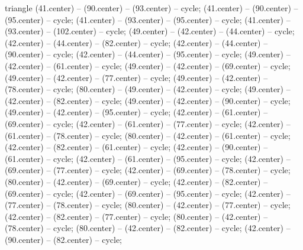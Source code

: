 {\begin{pgfonlayer}{triangle}
 (41.center) -- (90.center) -- (93.center) -- cycle; 
 (41.center) -- (90.center) -- (95.center) -- cycle; 
 (41.center) -- (93.center) -- (95.center) -- cycle; 
 (41.center) -- (93.center) -- (102.center) -- cycle; 
 (49.center) -- (42.center) -- (44.center) -- cycle; 
 (42.center) -- (44.center) -- (82.center) -- cycle; 
 (42.center) -- (44.center) -- (90.center) -- cycle; 
 (42.center) -- (44.center) -- (95.center) -- cycle; 
 (49.center) -- (42.center) -- (61.center) -- cycle; 
 (49.center) -- (42.center) -- (69.center) -- cycle; 
 (49.center) -- (42.center) -- (77.center) -- cycle; 
 (49.center) -- (42.center) -- (78.center) -- cycle; 
 (80.center) -- (49.center) -- (42.center) -- cycle; 
 (49.center) -- (42.center) -- (82.center) -- cycle; 
 (49.center) -- (42.center) -- (90.center) -- cycle; 
 (49.center) -- (42.center) -- (95.center) -- cycle; 
 (42.center) -- (61.center) -- (69.center) -- cycle; 
 (42.center) -- (61.center) -- (77.center) -- cycle; 
 (42.center) -- (61.center) -- (78.center) -- cycle; 
 (80.center) -- (42.center) -- (61.center) -- cycle; 
 (42.center) -- (82.center) -- (61.center) -- cycle; 
 (42.center) -- (90.center) -- (61.center) -- cycle; 
 (42.center) -- (61.center) -- (95.center) -- cycle; 
 (42.center) -- (69.center) -- (77.center) -- cycle; 
 (42.center) -- (69.center) -- (78.center) -- cycle; 
 (80.center) -- (42.center) -- (69.center) -- cycle; 
 (42.center) -- (82.center) -- (69.center) -- cycle; 
 (42.center) -- (69.center) -- (95.center) -- cycle; 
 (42.center) -- (77.center) -- (78.center) -- cycle; 
 (80.center) -- (42.center) -- (77.center) -- cycle; 
 (42.center) -- (82.center) -- (77.center) -- cycle; 
 (80.center) -- (42.center) -- (78.center) -- cycle; 
 (80.center) -- (42.center) -- (82.center) -- cycle; 
 (42.center) -- (90.center) -- (82.center) -- cycle; 

\end{pgfonlayer}}
